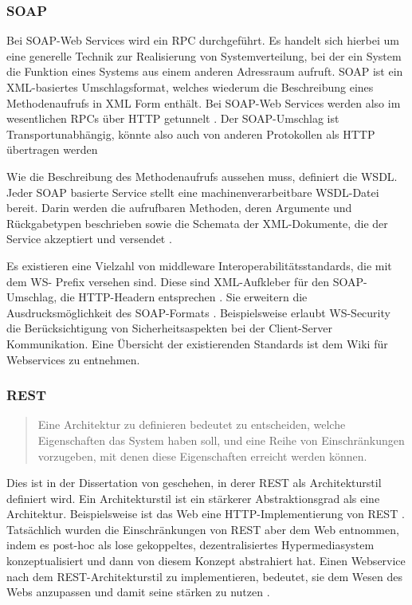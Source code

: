 \documentclass[12pt,a4paper,bibliography=totocnumbered,listof=totoc]{scrartcl}
\begin{document}
\subsubsection{SOAP}
Bei SOAP-Web Services wird ein \ac{RPC} durchgeführt. Es handelt sich hierbei um eine generelle Technik zur Realisierung von Systemverteilung, bei der ein System die Funktion eines Systems aus einem anderen Adressraum aufruft. SOAP ist ein XML-basiertes Umschlagsformat, welches wiederum die Beschreibung eines Methodenaufrufs in XML Form enthält. Bei SOAP-Web Services werden also im wesentlichen \ac{RPC}s über HTTP getunnelt \citep{wilde11}. Der SOAP-Umschlag ist Transportunabhängig, könnte also auch von anderen Protokollen als HTTP übertragen werden \citep{tilkov11}

Wie die Beschreibung des Methodenaufrufs aussehen muss, definiert die \ac{WSDL}. Jeder SOAP basierte Service stellt eine machinenverarbeitbare \ac{WSDL}-Datei bereit. Darin werden die aufrufbaren Methoden, deren Argumente und Rückgabetypen beschrieben sowie die Schemata der XML-Dokumente, die der Service akzeptiert und versendet \citep{richardson07}.

Es existieren eine Vielzahl von middleware Interoperabilitätsstandards, die mit dem \glqq WS-\grqq{} Prefix versehen sind. Diese sind XML-Aufkleber für den SOAP-Umschlag, die HTTP-Headern entsprechen \citep{richardson07}. Sie erweitern die Ausdrucksmöglichkeit des SOAP-Formats \citep{wilde11}. Beispielsweise erlaubt WS-Security die Berücksichtigung von Sicherheitsaspekten bei der Client-Server Kommunikation.  Eine Übersicht der existierenden Standards ist dem Wiki für Webservices \citeauthor{webServiceWiki09} zu entnehmen.

\subsubsection{REST}
\begin{quote}
\glqq Eine Architektur zu definieren bedeutet zu entscheiden, welche Eigenschaften das System haben soll, und eine Reihe von Einschränkungen vorzugeben, mit denen diese Eigenschaften erreicht werden können.\grqq{} \citep{tilkov11}
\end{quote}

Dies ist in der Dissertation von \citeauthor{fielding00} geschehen, in derer REST als Architekturstil definiert wird. Ein Architekturstil ist ein stärkerer Abstraktionsgrad als eine Architektur. Beispielsweise ist das Web eine HTTP-Implementierung von REST \citep{tilkov11}. Tatsächlich wurden die Einschränkungen von REST aber dem Web entnommen, indem \citeauthor{fielding00} es post-hoc als lose gekoppeltes, dezentralisiertes Hypermediasystem konzeptualisiert \citep{wilde11} und dann von diesem Konzept abstrahiert hat. Einen Webservice nach dem REST-Architekturstil zu implementieren, bedeutet, sie dem Wesen des Webs anzupassen und damit seine stärken zu nutzen \citep{tilkov11}.
\end{document}
